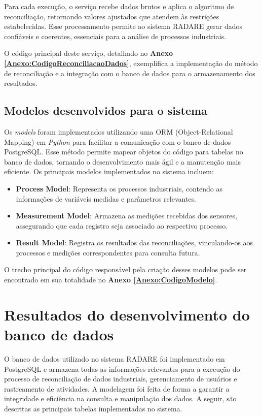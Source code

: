 Para cada execução, o serviço recebe dados brutos e aplica o algoritmo de reconciliação, retornando valores ajustados que atendem às restrições estabelecidas. Esse processamento permite ao sistema RADARE gerar dados confiáveis e coerentes, essenciais para a análise de processos industriais. 

O código principal deste serviço, detalhado no \textbf{Anexo \ref{Anexo:CodigoReconciliacaoDados}}, exemplifica a implementação do método de reconciliação e a integração com o banco de dados para o armazenamento dos resultados.

\subsection{Modelos desenvolvidos para o sistema}

Os \textit{models} foram implementados utilizando uma ORM (Object-Relational Mapping) em \textit{Python} para facilitar a comunicação com o banco de dados PostgreSQL. Esse método permite mapear objetos do código para tabelas no banco de dados, tornando o desenvolvimento mais ágil e a manutenção mais eficiente. Os principais modelos implementados no sistema incluem:

\begin{itemize}
    \item \textbf{Process Model}: Representa os processos industriais, contendo as informações de variáveis medidas e parâmetros relevantes.
    \item \textbf{Measurement Model}: Armazena as medições recebidas dos sensores, assegurando que cada registro seja associado ao respectivo processo.
    \item \textbf{Result Model}: Registra os resultados das reconciliações, vinculando-os aos processos e medições correspondentes para consulta futura.
\end{itemize}

O trecho principal do código responsável pela criação desses modelos pode ser encontrado em sua totalidade no \textbf{Anexo \ref{Anexo:CodigoModelo}}.

\section{Resultados do desenvolvimento do banco de dados}

O banco de dados utilizado no sistema RADARE foi implementado em PostgreSQL e armazena todas as informações relevantes para a execução do processo de reconciliação de dados industriais, gerenciamento de usuários e rastreamento de atividades. A modelagem foi feita de forma a garantir a integridade e eficiência na consulta e manipulação dos dados. A seguir, são descritas as principais tabelas implementadas no sistema.

